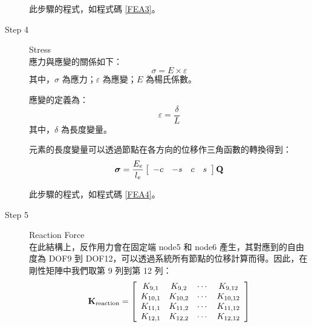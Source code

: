\documentclass[12pt]{article}
\numberwithin{figure}{section}
\numberwithin{table}{section}
\numberwithin{equation}{section}
\begin{document}
\begin{CJK}{UTF8}{bkai}
\begin{description}
        此步驟的程式，如程式碼 \ref{FEA3}。\\
        

	\item [Step 4] Stress\\
		應力與應變的關係如下：
		\begin{equation}
		\sigma=E\times \varepsilon
		\end{equation}
		其中，$\sigma$ 為應力；$\varepsilon$ 為應變；$E$ 為楊氏係數。

		應變的定義為：
		\begin{equation}
		\varepsilon = \frac{\delta}{L}
		\end{equation}
		其中，$\delta$ 為長度變量。

		元素的長度變量可以透過節點在各方向的位移作三角函數的轉換得到：
		\begin{equation}
		\label{eq_stress}
		\boldsymbol{\sigma} = \displaystyle \frac{E_e}{l_e} \left[ \begin{array}{cccc} -c & -s & c & s \\	\end{array} \right]{\bf Q}\\
		\end{equation}

        此步驟的程式，如程式碼 \ref{FEA4}。\\
        

	\item [Step 5] Reaction Force\\
		在此結構上，反作用力會在固定端 node5 和 node6 產生，其對應到的自由度為 DOF9 到 DOF12，可以透過系統所有節點的位移計算而得。因此，在剛性矩陣中我們取第 9 列到第 12 列：
		\begin{equation}
		\label{eq_kReaction}
		{\bf K}_{\mathrm{reaction}}=
		\left[
		\begin{array}{cccc}
		K_{9,1} & K_{9,2} & \cdots &K_{9,12}\\
		K_{10,1} & K_{10,2} & \cdots &K_{10,12}\\
		K_{11,1} & K_{11,2} &  \cdots&K_{11,12}\\
		K_{12,1} & K_{12,2} & \cdots &K_{12,12}\\
		\end{array}
		\right]
		\end{equation}


\end{description}
\end{CJK}
\end{document}
